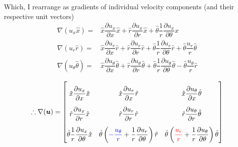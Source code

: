 \documentclass{kthreport}
\begin{document}
Which, I rearrange as gradients of individual velocity components (and their respective unit vectors)
\begin{subequations}
\begin{eqnarray}
\nabla (u_{x}\hat{x}) =& 
	\hat{x}\dfrac{\partial u_{x}}{\partial x} \hat{x} + \hat{r}\dfrac{\partial u_{x}}{\partial r}\hat{x} + \hat{\theta}\dfrac{1}{r}\dfrac{\partial u_{x}}{\partial \theta}\hat{x} \\
	\nabla (u_{r}\hat{r}) =& \hat{x}\dfrac{\partial u_{r}}{\partial x} \hat{r} + \hat{r}\dfrac{\partial u_{r}}{\partial r}\hat{r} + \hat{\theta}\dfrac{1}{r}\dfrac{\partial u_{r}}{\partial \theta}\hat{r}  + \hat{\theta}\dfrac{u_{r}}{r}\hat{\theta}\\
	\nabla (u_{\theta}\hat{\theta}) =& \hat{x}\dfrac{\partial u_{\theta}}{\partial x} \hat{\theta} + \hat{r}\dfrac{\partial u_{\theta}}{\partial r}\hat{\theta} + \hat{\theta}\dfrac{1}{r}\dfrac{\partial u_{\theta}}{\partial \theta}\hat{\theta}  - \hat{\theta}\dfrac{u_{\theta}}{r}\hat{r}
\end{eqnarray}
\end{subequations}


\begin{eqnarray}
	\def\arraystretch{2.5}
	\therefore \nabla(\bm{u}) = 
	\begin{bmatrix}
		\hat{x}\dfrac{\partial u_{x}}{\partial x}\hat{x} & \hat{x}\dfrac{\partial u_{r}}{\partial x}\hat{r}   &  \hat{x}\dfrac{\partial u_{\theta}}{\partial x}\hat{\theta} \\
		\hat{r}\dfrac{\partial u_{x}}{\partial r}\hat{x}  & \hat{r}\dfrac{\partial u_{r}}{\partial r}\hat{r}	&   \hat{r}\dfrac{\partial u_{\theta}}{\partial r}\hat{\theta}\\
		\hat{\theta}\dfrac{1}{r}\dfrac{\partial u_{x}}{\partial \theta}\hat{x} & \hat{\theta}\left(\color{blue}{-\dfrac{u_{\theta}}{r}} \color{black} + \dfrac{1}{r}\dfrac{\partial u_{r}}{\partial \theta} \right)\hat{r} 	& \hat{\theta}\left( \color{red}{\dfrac{u_{r}}{r}} \color{black} +\dfrac{1}{r} \dfrac{\partial u_{\theta}}{\partial \theta} \right)\hat{\theta}
	\end{bmatrix}
\end{eqnarray}
\end{document}
